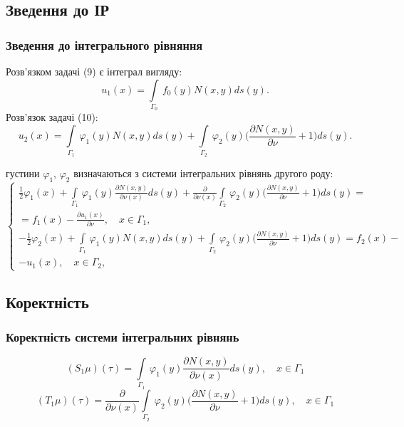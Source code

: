 \documentclass[10pt]{beamer}
\begin{document}
\subsection{Зведення до ІР}
\begin{frame}
\frametitle{Зведення до інтегрального рівняння}
Розв'язком задачі (9) є інтеграл вигляду:
\begin{equation}
u_{1}(x) = \int\limits_{\Gamma_{0}} \, f_{0}(y)N(x,y) ds(y). 
\end{equation}
Розв'язок задачі (10):
\begin{equation}
u_{2}(x) = \int\limits_{\Gamma_{1}} \, \varphi_{1}(y)N(x,y)ds(y)+\int\limits_{\Gamma_{2}} \, \varphi_{2}(y)\bigg(\frac{\partial N(x,y)}{\partial\nu} + 1\bigg)ds(y). 
\end{equation}
\end{frame}

\begin{frame}
густини $\varphi_{1}$, $\varphi_{2}$ визначаються з системи інтегральних рівнянь другого роду:
\begin{equation}\label{13}
 \left\{
\begin{array}{c}
   \displaystyle
\frac{1}{2}\varphi_{1}(x) + \int\limits_{\Gamma_1} \, \varphi_1(y)\frac{\partial N(x,y)}{\partial\nu(x)}ds(y)+\frac{\partial }{\partial\nu(x)}\int\limits_{\Gamma_2} \, \varphi_2(y)\bigg(\frac{\partial N(x,y)}{\partial\nu} + 1\bigg)ds(y) = \\=f_1(x) -\frac{\partial u_{1}(x)}{\partial\nu}, \quad x\in \Gamma_1,\\

	\displaystyle
  -\frac{1}{2}\varphi_{2}(x) + \int\limits_{\Gamma_1} \, \varphi_1(y)N(x,y)ds(y)+\int\limits_{\Gamma_2} \, \varphi_2(y)\bigg(\frac{\partial N(x,y)}{\partial\nu} + 1\bigg)ds(y)=f_2(x)- \\ -u_{1}(x), \quad x\in \Gamma_2,
 \end{array}
\right.
\end{equation}

\end{frame}

\subsection{Коректність}
\begin{frame}
\frametitle{Коректність системи інтегральних рівнянь}
\begin{equation*}
(S_{1}\mu)(\tau)=\int\limits_{\Gamma_1} \, \varphi_1(y)\frac{\partial N(x,y)}{\partial\nu(x)}ds(y), \quad x\in \Gamma_1
\end{equation*}
\begin{equation*}
(T_{1}\mu)(\tau)=\frac{\partial }{\partial\nu(x)}\int\limits_{\Gamma_2} \, \varphi_2(y)\bigg(\frac{\partial N(x,y)}{\partial\nu} + 1\bigg)ds(y), \quad x\in \Gamma_1
\end{equation*}
\end{frame}
\end{document}
